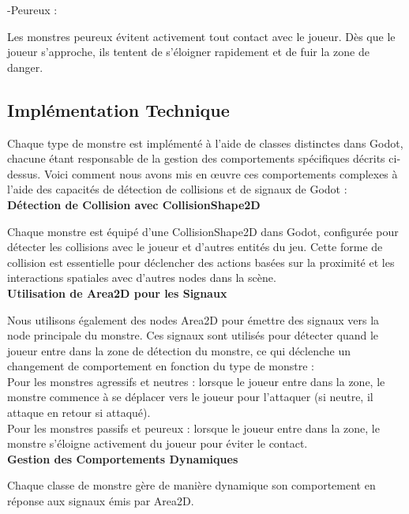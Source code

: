       -Peureux :

      Les monstres peureux évitent activement tout contact avec le joueur.
      Dès que le joueur s'approche, ils tentent de s'éloigner rapidement et de fuir la zone de danger.


      \subsection*{Implémentation Technique}
      Chaque type de monstre est implémenté à l'aide de classes distinctes dans Godot, 
      chacune étant responsable de la gestion des comportements spécifiques décrits ci-dessus.
      Voici comment nous avons mis en œuvre ces comportements complexes à l'aide des capacités de détection de collisions et de signaux de Godot :
      \\

      \textbf{Détection de Collision avec CollisionShape2D}

      Chaque monstre est équipé d'une CollisionShape2D dans Godot, configurée pour détecter les collisions avec le joueur et d'autres entités du jeu. 
      Cette forme de collision est essentielle pour déclencher des actions basées sur la proximité et les interactions spatiales avec d'autres nodes dans la scène.
      \\

      \textbf{Utilisation de Area2D pour les Signaux}

      Nous utilisons également des nodes Area2D pour émettre des signaux vers la node principale du monstre.
      Ces signaux sont utilisés pour détecter quand le joueur entre dans la zone de détection du monstre, 
      ce qui déclenche un changement de comportement en fonction du type de monstre :
      \\

      Pour les monstres agressifs et neutres : lorsque le joueur entre dans la zone, le monstre commence à se déplacer vers le joueur pour l'attaquer 
      (si neutre, il attaque en retour si attaqué).
      \\

      Pour les monstres passifs et peureux : lorsque le joueur entre dans la zone, le monstre s'éloigne activement du joueur pour éviter le contact.
      \\

      \textbf{Gestion des Comportements Dynamiques}

      Chaque classe de monstre gère de manière dynamique son comportement en réponse aux signaux émis par Area2D. 


